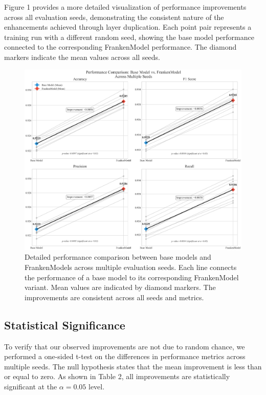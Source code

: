 \documentclass{article}
\begin{document}
Figure 1 provides a more detailed visualization of performance improvements across all evaluation seeds, demonstrating the consistent nature of the enhancements achieved through layer duplication. Each point pair represents a training run with a different random seed, showing the base model performance connected to the corresponding FrankenModel performance. The diamond markers indicate the mean values across all seeds.

\begin{figure}[H]
\centering
\includegraphics[width=\textwidth]{metric_comparison.png}
\caption{Detailed performance comparison between base models and FrankenModels across multiple evaluation seeds. Each line connects the performance of a base model to its corresponding FrankenModel variant. Mean values are indicated by diamond markers. The improvements are consistent across all seeds and metrics.}
\end{figure}

\subsection{Statistical Significance}
To verify that our observed improvements are not due to random chance, we performed a one-sided t-test on the differences in performance metrics across multiple seeds. The null hypothesis states that the mean improvement is less than or equal to zero. As shown in Table 2, all improvements are statistically significant at the $\alpha = 0.05$ level.
\end{document}
